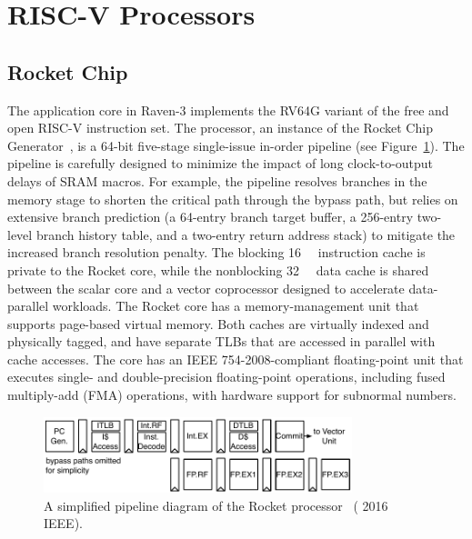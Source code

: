 \documentclass[graybox]{svmult}
\begin{document}
\section{RISC-V Processors}

\subsection{Rocket Chip}

The application core in Raven-3 implements the RV64G variant of the free and open RISC-V instruction set.
The processor, an instance of the Rocket Chip Generator~\cite{Rocket2016}, is a 64-bit five-stage single-issue in-order pipeline (see Figure~\ref{fig:6-raven3-rocket}).
The pipeline is carefully designed to minimize the impact of long clock-to-output delays of SRAM macros.
For example, the pipeline resolves branches in the memory stage to shorten the critical path through the bypass path, but relies on extensive branch prediction (a 64-entry branch target buffer, a 256-entry two-level branch history table, and a two-entry return address stack) to mitigate the increased branch resolution penalty.
The blocking \SI{16}{\kibi\byte} instruction cache is private to the Rocket core, while the nonblocking \SI{32}{\kibi\byte} data cache is shared between the scalar core and a vector coprocessor designed to accelerate data-parallel workloads.
The Rocket core has a memory-management unit that supports page-based virtual memory.
Both caches are virtually indexed and physically tagged, and have separate TLBs that are accessed in parallel with cache accesses.
The core has an IEEE 754-2008-compliant floating-point unit that executes single- and double-precision floating-point operations, including fused multiply-add (FMA) operations, with hardware support for subnormal numbers.

\begin{figure}
  \centering
  \includegraphics[width=0.8\textwidth]{6-raven3-rocket}
  \caption{A simplified pipeline diagram of the Rocket processor~\cite{Zimmer2016} ({\textcopyright} 2016 IEEE).}
  \label{fig:6-raven3-rocket}
\end{figure}
\end{document}

